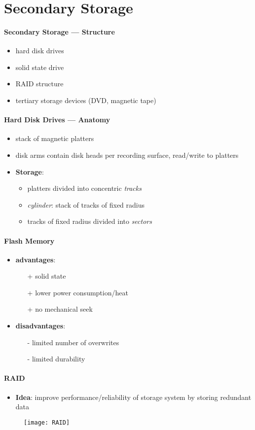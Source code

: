 \section{Secondary Storage}

\paragraph{Secondary Storage --- Structure}
\begin{itemize}
  \item hard disk drives
  \item solid state drive
  \item RAID structure
  \item tertiary storage devices (DVD, magnetic tape)
\end{itemize}

\paragraph{Hard Disk Drives --- Anatomy}
\begin{itemize}
  \item stack of magnetic platters
  \item disk arms contain disk heads per recording surface, read/write to platters
  \item \textbf{Storage}:
  \begin{itemize}
    \item platters divided into concentric \emph{tracks}
    \item \emph{cylinder}: stack of tracks of fixed radius
    \item tracks of fixed radius divided into \emph{sectors}
  \end{itemize}
\end{itemize}

\paragraph{Flash Memory}
\begin{itemize}
  \item \textbf{advantages}:
  \begin{itemize}
    \item[+] solid state
    \item[+] lower power consumption/heat
    \item[+] no mechanical seek 
  \end{itemize}
  \item \textbf{disadvantages}:
  \begin{itemize}
    \item[-] limited number of overwrites
    \item[-] limited durability 
  \end{itemize}
\end{itemize}

\paragraph{RAID}
\begin{itemize}
  \item \textbf{Idea}: improve performance/reliability of storage system by storing redundant data
\end{itemize}
\begin{figure}[h]\centering\label{RAID}\texttt{[image: RAID]}\end{figure}